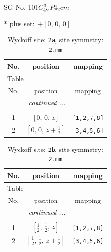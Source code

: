 \documentclass[fleqn,8pt]{jsarticle}
\begin{document}
\setcounter{MaxMatrixCols}{32}

\renewcommand{\tablename}{Table~}
\renewcommand{\figurename}{Figure~}
\begin{center}
\LARGE
SG No. 101\quad$C_{\rm 4v}^{3}$\quad$P4_2cm$\quad[ tetragonal ]
\end{center}
* plus set:\,\,\,$+\left[ 0,\, 0,\, 0 \right]$
\renewcommand{\arraystretch}{1.2}
\begin{longtable}{ccc}
\caption{Wyckoff site: {\tt 2a}, site symmetry: {\tt 2.mm}}
 \\
 \hline \hline
No. & position & mapping \\ \hline \endfirsthead

\multicolumn{2}{l}{\tablename\ \thetable{}} \\
 \hline \hline
No. & position & mapping \\ \hline \endhead

 \hline \hline
\multicolumn{2}{r}{\footnotesize\it continued ...} \\ \endfoot

 \hline \hline
\multicolumn{2}{r}{} \\ \endlastfoot

1 & $\left[ 0,\, 0,\, z \right]$ & {\tt [1,2,7,8]} \\ \hline
2 & $\left[ 0,\, 0,\, z + \frac{1}{2} \right]$ & {\tt [3,4,5,6]} \\
\end{longtable}
\renewcommand{\arraystretch}{1.2}
\begin{longtable}{ccc}
\caption{Wyckoff site: {\tt 2b}, site symmetry: {\tt 2.mm}}
 \\
 \hline \hline
No. & position & mapping \\ \hline \endfirsthead

\multicolumn{2}{l}{\tablename\ \thetable{}} \\
 \hline \hline
No. & position & mapping \\ \hline \endhead

 \hline \hline
\multicolumn{2}{r}{\footnotesize\it continued ...} \\ \endfoot

 \hline \hline
\multicolumn{2}{r}{} \\ \endlastfoot

1 & $\left[ \frac{1}{2},\, \frac{1}{2},\, z \right]$ & {\tt [1,2,7,8]} \\ \hline
2 & $\left[ \frac{1}{2},\, \frac{1}{2},\, z + \frac{1}{2} \right]$ & {\tt [3,4,5,6]} \\
\end{longtable}
\end{document}
